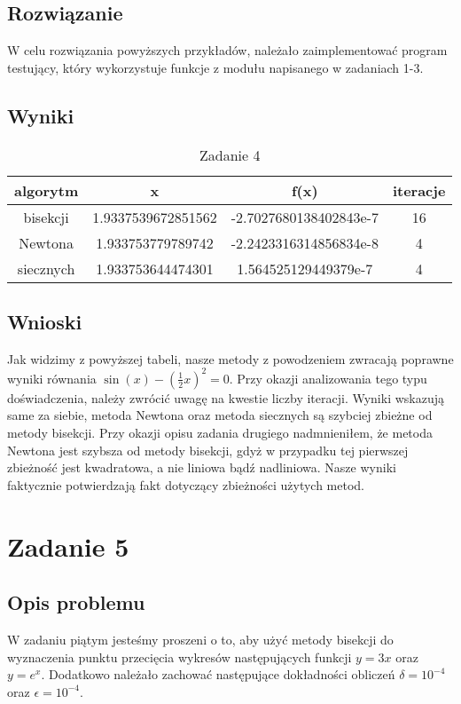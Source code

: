 \documentclass{article}
\begin{document}
\begin{center}
    \subsection{Rozwiązanie}
    \large W celu rozwiązania powyższych przykładów, należało zaimplementować program testujący, który wykorzystuje funkcje z modułu napisanego w zadaniach 1-3.
    \subsection{Wyniki}
    \begin{table}[h!]
        \centering
        \begin{tabular}{||c c c c||} 
        \hline
        \textbf{algorytm} & \textbf{x} & \textbf{f(x)} & \textbf{iteracje} \\ [0.5ex]
        \hline\hline
         bisekcji & 1.9337539672851562  & -2.7027680138402843e-7 & 16 \\
         Newtona & 1.933753779789742 & -2.2423316314856834e-8 & 4 \\
         siecznych & 1.933753644474301 & 1.564525129449379e-7 & 4 \\
        \hline
        \end{tabular}
        \caption{Zadanie 4}
        \label{table:1}
    \end{table} 
    
    \subsection{Wnioski}
    \large Jak widzimy z powyższej tabeli, nasze metody z powodzeniem zwracają poprawne wyniki równania \(\sin(x) - (\frac{1}{2}x)^2 = 0\).
     Przy okazji analizowania tego typu doświadczenia, należy zwrócić uwagę na kwestie liczby iteracji. Wyniki wskazują same za siebie,
     metoda Newtona oraz metoda siecznych są szybciej zbieżne od metody bisekcji. Przy okazji opisu zadania drugiego nadmnieniłem,
     że metoda Newtona jest szybsza od metody bisekcji, gdyż w przypadku tej pierwszej zbieżność jest kwadratowa, a nie liniowa bądź nadliniowa.
     Nasze wyniki faktycznie potwierdzają fakt dotyczący zbieżności użytych metod.
    \section{Zadanie 5}
    \subsection{Opis problemu}
     \large W zadaniu piątym jesteśmy proszeni o to, aby użyć metody bisekcji do wyznaczenia
      punktu przecięcia wykresów następujących funkcji \(y = 3x\) oraz \(y = e^x\). 
      Dodatkowo należało zachować następujące dokładności obliczeń \(\delta = 10^{-4}\) oraz \(\epsilon = 10^{-4}\).

\end{center}
\end{document}
